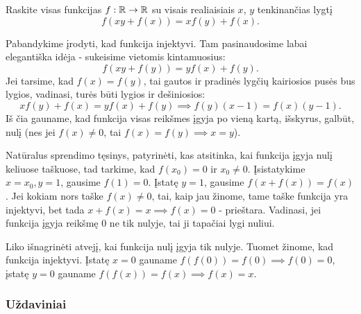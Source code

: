 \begin{pavnr} Raskite visas funkcijas $f: \mathbb R \to \mathbb R$ su visais
  realiaisiais $x$, $y$ tenkinančias lygtį $$f(xy+f(x))=xf(y)+f(x).$$
\end{pavnr}

\begin{sprendimas}
  Pabandykime įrodyti, kad funkcija injektyvi. Tam pasinaudosime labai
  elegantiška idėja - sukeisime vietomis kintamuosius:
  $$f(xy+f(y)) = yf(x) + f(y).$$
  Jei tarsime, kad $f(x)=f(y)$, tai gautos ir pradinės lygčių kairiosios
  pusės bus lygios, vadinasi, turės būti lygios ir dešiniosios: 
  $$xf(y) + f(x) = yf(x) + f(y) \implies f(y)(x-1)=f(x)(y-1).$$ 
  Iš čia gauname, kad funkcija visas reikšmes įgyja po vieną kartą,
  išskyrus, galbūt, nulį (nes jei $f(x)\neq 0$, tai $f(x)=f(y)\implies
  x=y$). 
  
  Natūralus sprendimo tęsinys, patyrinėti, kas atsitinka, kai funkcija
  įgyja nulį keliuose taškuose, tad tarkime, kad $f(x_0) = 0$ ir $x_0 \neq
  0$.  Įsistatykime $x=x_0, y=1$, gausime $f(1)=0$. Įstatę $y=1$, gausime
  $f(x+f(x))=f(x)$. Jei kokiam nors taške $f(x)\neq 0$, tai, kaip jau
  žinome, tame taške funkcija yra injektyvi, bet tada $x + f(x) = x \implies f(x)=0$ -
  prieštara. Vadinasi, jei funkcija įgyja reikšmę $0$ ne tik nulyje, tai ji
  tapačiai lygi nuliui.  
  
  Liko išnagrinėti atvejį, kai funkcija nulį įgyja tik nulyje. Tuomet
  žinome, kad funkcija injektyvi. Įstatę $x=0$ gauname $f(f(0))=f(0)
  \implies f(0)=0$, įstatę $y=0$ gauname $f(f(x))=f(x) \implies f(x)=x$.
\end{sprendimas}
 
\subsubsection{Uždaviniai}

